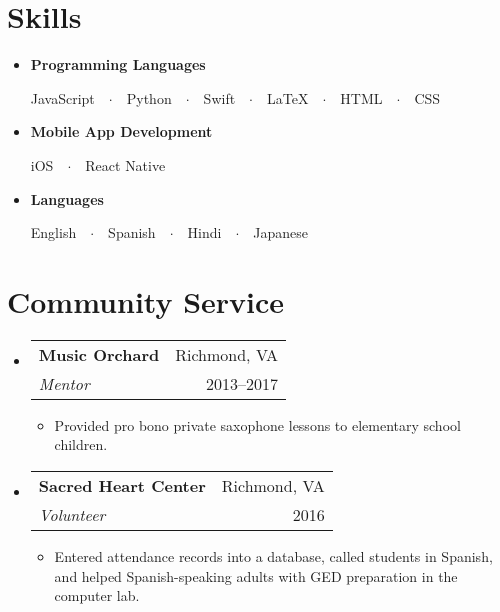 \documentclass{article}
\makeatletter
\newcommand{\resumeSubHeadingListStart}{\begin{itemize}[leftmargin=*]}
\newcommand{\resumeSubHeadingListEnd}{\end{itemize}}
\newcommand{\workSubheading}[5]{
\item
\begin{tabular*}{\textwidth}{l@{\extracolsep{\fill}}r}
\textbf{\large#1} & {\small #2} \\
\textit{#3} & {#4}
\end{tabular*}
\vspace{-1em}
\begin{itemize}
\item #5
\end{itemize}
\vspace{0.25em}}
\newlength{\spacebox}
\newcommand{\skillEntry}[2]{
\item
\hspace{1em}\parbox{\spacebox}{
\raggedright{\textbf{#1}}}
\hspace{-2.5em} #2 \par}
\makeatother
\begin{document}

\vspace{-1em}
\section{Skills}

\resumeSubHeadingListStart
\skillEntry{Programming Languages}
{JavaScript\ \ $\cdotp$\ \ Python\ \ $\cdotp$\ \ Swift\ \ $\cdotp$\ \ \LaTeX\ \ $\cdotp$\ \ HTML\ \ $\cdotp$\ \ CSS}

\skillEntry{Mobile App Development}
{iOS\ \ $\cdotp$\ \ React Native}

\skillEntry{Languages}
{English\ \ $\cdotp$\ \ Spanish\ \ $\cdotp$\ \ Hindi\ \ $\cdotp$\ \ Japanese}
\resumeSubHeadingListEnd



\vspace{-1em}
\section{Community Service}

\resumeSubHeadingListStart
\workSubheading{Music Orchard}{Richmond, VA}
{Mentor}{2013--2017}
{Provided pro bono private saxophone lessons to elementary school children.}

\workSubheading{Sacred Heart Center}{Richmond, VA}
{Volunteer}{2016}
{Entered attendance records into a database, called students in Spanish, and helped Spanish-speaking adults with GED preparation in the computer lab.}
\resumeSubHeadingListEnd
\end{document}
